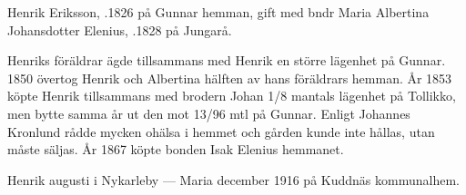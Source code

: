 %
Henrik Eriksson, .1826 på Gunnar hemman, gift med bndr Maria Albertina Johansdotter Elenius, .1828 på Jungarå.
\begin{jhchildren}
  \item {}
  \item {}
  \item {}
  \item {}
  \item {}
  \item {}
  \item {}
  \item {}
  \item {}
  \item {}
\end{jhchildren}

Henriks föräldrar ägde tillsammans med Henrik en större lägenhet på Gunnar. 1850 övertog Henrik och Albertina hälften av hans föräldrars hemman. År 1853 köpte Henrik tillsammans med brodern Johan 1/8 mantals lägenhet på Tollikko, men bytte samma år ut den mot 13/96 mtl på Gunnar. Enligt Johannes Kronlund rådde mycken ohälsa i hemmet och gården kunde inte hållas, utan måste säljas. År 1867 köpte bonden Isak Elenius hemmanet.

Henrik  augusti i Nykarleby  ---  Maria  december 1916 på Kuddnäs kommunalhem.



%




